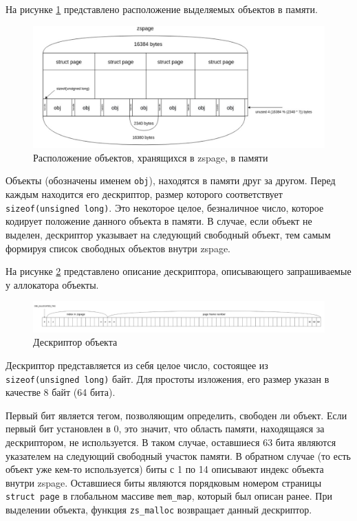 На рисунке \ref{fig:zspage_mem} представлено расположение выделяемых объектов в памяти.

\begin{figure}[h]
	\centering
	\includegraphics[width=\textwidth]{img/zspage_mem.png}
	\caption{Расположение объектов, хранящихся в zspage, в памяти}
	\label{fig:zspage_mem}
\end{figure}

Объекты (обозначены именем \texttt{obj}), находятся в памяти друг за другом. Перед каждым находится его дескриптор, размер которого соответствует\\ \texttt{sizeof(unsigned long)}. Это некоторое целое, безналичное число, которое кодирует положение данного объекта в памяти. В случае, если объект не выделен, дескриптор указывает на следующий свободный объект, тем самым формируя список свободных объектов внутри zspage. 

На рисунке \ref{fig:handle} представлено описание дескриптора, описывающего запрашиваемые у аллокатора объекты. 

\begin{figure}[h]
	\centering
	\includegraphics[width=\textwidth]{img/handle.png}
	\caption{Дескриптор объекта}
	\label{fig:handle}
\end{figure}

Дескриптор представляется из себя целое число, состоящее из \\ \texttt{sizeof(unsigned long)} байт. Для простоты изложения, его размер указан в качестве 8 байт (64 бита). 

Первый бит является тегом, позволяющим определить, свободен ли объект. Если первый бит установлен в 0, это значит, что область памяти, находящаяся за дескриптором, не используется. В таком случае, оставшиеся 63 бита являются указателем на следующий свободный участок памяти. В обратном случае (то есть объект уже кем-то используется) биты с 1 по 14 описывают индекс объекта внутри zspage. Оставшиеся биты являются порядковым номером страницы \texttt{struct page} в глобальном массиве \texttt{mem\_map}, который был описан ранее. При выделении объекта, функция \texttt{zs\_malloc} возвращает данный дескриптор.

